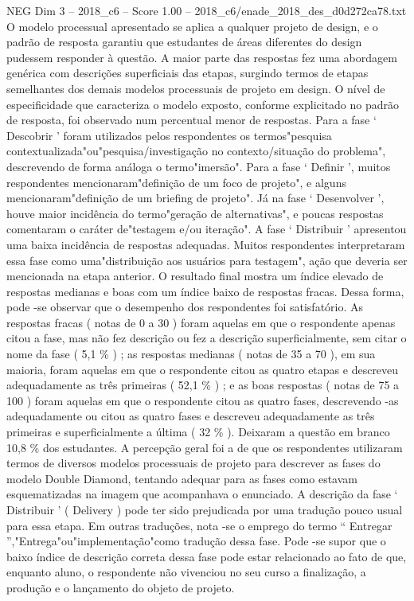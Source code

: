 \begin{textsample}{NEG Dim 3 – 2018\_c6 – Score 1.00 – 2018\_c6/enade\_2018\_des\_d0d272ca78.txt}
O modelo processual apresentado se aplica a qualquer projeto de design, e o padrão de resposta garantiu que estudantes de áreas diferentes do design pudessem responder à questão.
A maior parte das respostas fez uma abordagem genérica com descrições superficiais das etapas, surgindo termos de etapas semelhantes dos demais modelos processuais de projeto em design.
O nível de especificidade que caracteriza o modelo exposto, conforme explicitado no padrão de resposta, foi observado num percentual menor de respostas.
Para a fase ‘ Descobrir ’ foram utilizados pelos respondentes os termos"pesquisa contextualizada"ou"pesquisa/investigação no contexto/situação do problema", descrevendo de forma análoga o termo"imersão".
Para a fase ‘ Definir ’, muitos respondentes mencionaram"definição de um foco de projeto", e alguns mencionaram"definição de um briefing de projeto".
Já na fase ‘ Desenvolver ’, houve maior incidência do termo"geração de alternativas", e poucas respostas comentaram o caráter de"testagem e/ou iteração".
A fase ‘ Distribuir ’ apresentou uma baixa incidência de respostas adequadas.
Muitos respondentes interpretaram essa fase como uma"distribuição aos usuários para testagem", ação que deveria ser mencionada na etapa anterior.
O resultado final mostra um índice elevado de respostas medianas e boas com um índice baixo de respostas fracas.
Dessa forma, pode -se observar que o desempenho dos respondentes foi satisfatório.
As respostas fracas ( notas de 0 a 30 ) foram aquelas em que o respondente apenas citou a fase, mas não fez descrição ou fez a descrição superficialmente, sem citar o nome da fase ( 5,1 \% ) ; as respostas medianas ( notas de 35 a 70 ), em sua maioria, foram aquelas em que o respondente citou as quatro etapas e descreveu adequadamente as três primeiras ( 52,1 \% ) ; e as boas respostas ( notas de 75 a 100 ) foram aquelas em que o respondente citou as quatro fases, descrevendo -as adequadamente ou citou as quatro fases e descreveu adequadamente as três primeiras e superficialmente a última ( 32 \% ).
Deixaram a questão em branco 10,8 \% dos estudantes.
A percepção geral foi a de que os respondentes utilizaram termos de diversos modelos processuais de projeto para descrever as fases do modelo Double Diamond, tentando adequar para as fases como estavam esquematizadas na imagem que acompanhava o enunciado.
A descrição da fase ‘ Distribuir ’ ( Delivery ) pode ter sido prejudicada por uma tradução pouco usual para essa etapa.
Em outras traduções, nota -se o emprego do termo “ Entregar ”,"Entrega"ou"implementação"como tradução dessa fase.
Pode -se supor que o baixo índice de descrição correta dessa fase pode estar relacionado ao fato de que, enquanto aluno, o respondente não vivenciou no seu curso a finalização, a produção e o lançamento do objeto de projeto.

\end{textsample}
